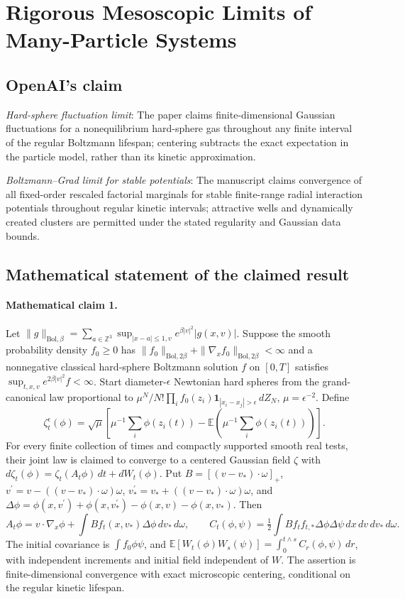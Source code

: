 \documentclass[11pt]{article}
\begin{document}
\section*{Rigorous Mesoscopic Limits of Many-Particle Systems}

\subsection{OpenAI's claim}
\textit{Hard-sphere fluctuation limit}: The paper claims finite-dimensional Gaussian fluctuations for a nonequilibrium hard-sphere gas throughout any finite interval of the regular Boltzmann lifespan; centering subtracts the exact expectation in the particle model, rather than its kinetic approximation.

\textit{Boltzmann--Grad limit for stable potentials}: The manuscript claims convergence of all fixed-order rescaled factorial marginals for stable finite-range radial interaction potentials throughout regular kinetic intervals; attractive wells and dynamically created clusters are permitted under the stated regularity and Gaussian data bounds.

\subsection{Mathematical statement of the claimed result}
\paragraph{Mathematical claim 1.} Let $\|g\|_{\mathrm{Bol},\beta}=\sum_{a\in\mathbb Z^3}\sup_{|x-a|\le1,v}e^{\beta|v|^2}|g(x,v)|$. Suppose the smooth probability density $f_0\ge0$ has $\|f_0\|_{\mathrm{Bol},2\beta}+\|\nabla_xf_0\|_{\mathrm{Bol},2\beta}<\infty$ and a nonnegative classical hard-sphere Boltzmann solution $f$ on $[0,T]$ satisfies $\sup_{t,x,v}e^{2\beta|v|^2}f<\infty$. Start diameter-$\epsilon$ Newtonian hard spheres from the grand-canonical law proportional to $\mu^N/N!\prod_if_0(z_i)\mathbf1_{|x_i-x_j|>\epsilon}\,dZ_N$, $\mu=\epsilon^{-2}$. Define \[\zeta_t^\epsilon(\phi)=\sqrt\mu\left[\mu^{-1}\sum_i\phi(z_i(t))-\mathbb E\left(\mu^{-1}\sum_i\phi(z_i(t))\right)\right].\] For every finite collection of times and compactly supported smooth real tests, their joint law is claimed to converge to a centered Gaussian field $\zeta$ with $d\zeta_t(\phi)=\zeta_t(A_t\phi)\,dt+dW_t(\phi)$. Put $B=[(v-v_*)\cdot\omega]_+$, $v^\prime=v-((v-v_*)\cdot\omega)\omega$, $v_*^\prime=v_*+((v-v_*)\cdot\omega)\omega$, and $\Delta\phi=\phi(x,v^\prime)+\phi(x,v_*^\prime)-\phi(x,v)-\phi(x,v_*)$. Then \[A_t\phi=v\cdot\nabla_x\phi+\int Bf_t(x,v_*)\Delta\phi\,dv_*\,d\omega,\qquad C_t(\phi,\psi)=\tfrac12\int Bf_tf_{t,*}\Delta\phi\Delta\psi\,dx\,dv\,dv_*\,d\omega.\] The initial covariance is $\int f_0\phi\psi$, and $\mathbb E[W_t(\phi)W_s(\psi)]=\int_0^{t\wedge s}C_r(\phi,\psi)\,dr$, with independent increments and initial field independent of $W$. The assertion is finite-dimensional convergence with exact microscopic centering, conditional on the regular kinetic lifespan.
\end{document}
